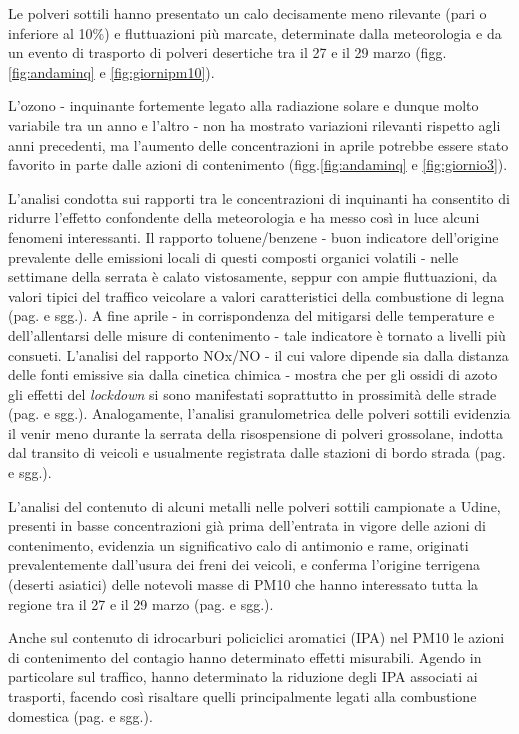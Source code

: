 Le polveri sottili hanno presentato un calo decisamente meno rilevante (pari o inferiore al 10\%) e fluttuazioni più marcate, determinate dalla meteorologia e da un evento di trasporto di polveri desertiche tra il 27 e il 29 marzo (figg.\ref{fig:andaminq} e \ref{fig:giornipm10}). 

L'ozono - inquinante fortemente legato alla radiazione solare e dunque molto variabile tra un anno e l'altro - non ha mostrato variazioni rilevanti rispetto agli anni precedenti, ma l'aumento delle concentrazioni in aprile potrebbe essere stato favorito in parte dalle azioni di contenimento  (figg.\ref{fig:andaminq} e \ref{fig:giornio3}). 

L'analisi condotta sui rapporti tra le concentrazioni di inquinanti ha consentito di ridurre l'effetto confondente della meteorologia e ha messo così in luce alcuni fenomeni interessanti. Il rapporto toluene/benzene - buon indicatore dell'origine prevalente delle emissioni locali di questi composti organici volatili - nelle settimane della serrata è calato vistosamente, seppur con ampie fluttuazioni, da valori tipici del traffico veicolare a valori caratteristici della combustione di legna (pag.\pageref{cap:tb} e sgg.). A fine aprile - in corrispondenza del mitigarsi delle temperature e dell'allentarsi delle misure di contenimento - tale indicatore è tornato a livelli più consueti. L'analisi del rapporto NOx/NO - il cui valore dipende sia dalla distanza delle fonti emissive sia dalla cinetica chimica - mostra che per gli ossidi di azoto gli effetti del \textit{lockdown} si sono manifestati soprattutto in prossimità delle strade  (pag.\pageref{cap:noxno} e sgg.). Analogamente, l'analisi granulometrica delle polveri sottili evidenzia il venir meno durante la serrata della risospensione di polveri grossolane, indotta dal transito di veicoli e usualmente registrata dalle stazioni di bordo strada (pag.\pageref{cap:cef} e sgg.).

L'analisi del contenuto di alcuni metalli nelle polveri sottili campionate a Udine, presenti in basse concentrazioni già prima dell'entrata in vigore delle azioni di contenimento, evidenzia un significativo calo di antimonio e rame, originati prevalentemente dall'usura dei freni dei veicoli, e conferma l'origine terrigena (deserti asiatici) delle notevoli masse di PM10 che hanno interessato tutta la regione tra il 27 e il 29 marzo (pag.\pageref{cap:metalli} e sgg.).

Anche sul contenuto di idrocarburi policiclici aromatici (IPA) nel PM10 le azioni di contenimento del contagio hanno determinato effetti misurabili. Agendo in particolare sul traffico, hanno determinato la riduzione degli IPA associati ai trasporti, facendo così risaltare quelli principalmente legati alla combustione domestica (pag.\pageref{cap:ipa} e sgg.).

